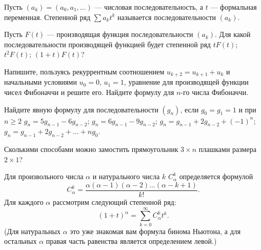 \documentclass[a4paper,12pt]{article}
\renewcommand{\binom}[2]{C_{#1}^{#2}}
\begin{document}
Пусть $(a_k)=(a_0,a_1,\dots)$ --- числовая последовательность, а
$t$ --- формальная переменная. Степенной ряд $\sum a_kt^k$
называется  последовательности
$(a_k)$.








Пусть $F(t)$ --- производящая функция последовательности $(a_k)$. Для
какой последовательности производящей функцией будет степенной ряд
 $tF(t)$;
 $t^2F(t)$;
 $(1+t)F(t)$?








Напишите, пользуясь рекуррентным соотношением
$u_{k+2}=u_{k+1}+u_k$ и начальными условиями $u_0=0$, $u_1=1$,
уравнение для производящей функции чисел Фибоначчи и решите его.
Найдите формулу для $n$-го числа Фибоначчи.








 Найдите явную формулу для последовательности $(g_n)$,
если $g_0=g_1=1$ и при $n\geq2$
$g_n=5g_{n-1}-6g_{n-2}$;
$g_n=6g_{n-1}-9g_{n-2}$;
$g_n=g_{n-1}+2g_{n-2}+(-1)^n$;
$g_n=g_{n-1}+2g_{n-2}+\ldots+n g_0$.









 Сколькими способами можно замостить
прямоугольник $3\times n$ плашками размера $2\times1$?










Для произвольного числа $\alpha$ и натурального числа $k$
 $\displaystyle\binom{\alpha}k$
определяется формулой
$$
\displaystyle\binom{\alpha}k=\frac{\alpha(\alpha-1)(\alpha-2)\dots(\alpha-k+1)}{k!}.
$$
Для каждого $\alpha$ рассмотрим следующий степенной ряд:
$$
\displaystyle(1+t)^\alpha=\sum_{k=0}^{\infty}\binom{\alpha}kt^k.
$$
(Для натуральных $\alpha$ это уже знакомая вам формула бинома
Ньютона, а для остальных $\alpha$ правая часть равенства является
определением левой.)
\end{document}
